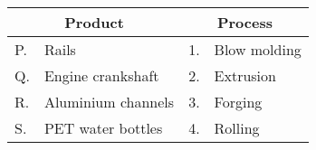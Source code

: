 \begin{tabular}{|l|l|l|l|}
\hline
\multicolumn{2}{|c|}{Product}&\multicolumn{2}{|c|}{Process}\\
\hline
P.& Rails & 1. &Blow molding \\
Q. &Engine crankshaft & 2. &Extrusion \\
R. &Aluminium channels & 3.& Forging \\
S. &PET water bottles & 4. &Rolling \\
\hline
\end{tabular}